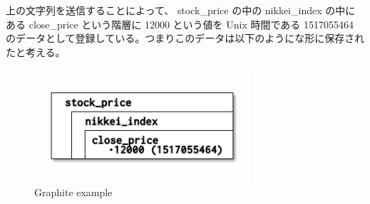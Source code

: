 \documentclass{scrartcl}
\begin{document}
上の文字列を送信することによって、 stock\_price の中の nikkei\_index の中にある close\_price という階層に 12000 という値を Unix 時間である 1517055464 のデータとして登録している。つまりこのデータは以下のようにな形に保存されたと考える。\\

\begin{figure}[htbp]
\centering
\includegraphics[width=8cm]{hoge.png}
\caption{Graphite example}
\end{figure}
\end{document}
